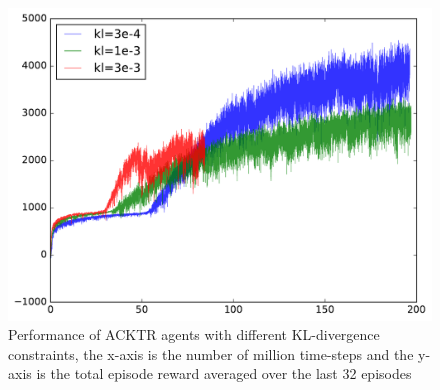 \begin{figure}[!htbp]
	\includegraphics[width=\textwidth]{images/rec_mix.pdf}
	\centering
	\caption{Performance of ACKTR agents with different KL-divergence constraints, the x-axis is the number of million time-steps and the y-axis is the total episode reward averaged over the last 32 episodes}\label{rec_mix}
\end{figure}
